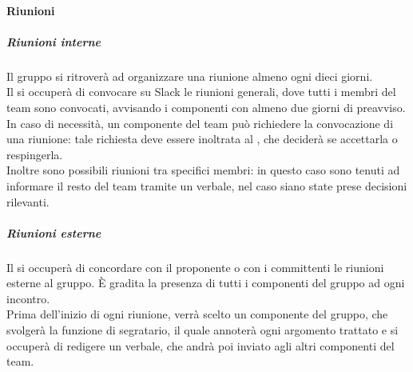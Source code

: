 	\paragraph{Riunioni}
		\subparagraph{Riunioni interne}
		Il gruppo si ritroverà ad organizzare una riunione almeno ogni dieci giorni. \\
		Il \RES si occuperà di convocare su Slack le riunioni generali, dove tutti i membri del team sono convocati, avvisando i componenti con almeno due giorni di preavviso. \\
		In caso di necessità, un componente del team può richiedere la convocazione di una riunione: tale richiesta deve essere inoltrata al \RES, che deciderà se accettarla o respingerla. \\
		Inoltre sono possibili riunioni tra specifici membri: in questo caso sono tenuti ad informare il resto del team tramite un verbale, nel caso siano state prese decisioni rilevanti. \\
		\subparagraph{Riunioni esterne}
		Il \RES si occuperà di concordare con il proponente o con i committenti le riunioni esterne al gruppo. È gradita la presenza di tutti i componenti del gruppo ad ogni incontro. \\
		Prima dell'inizio di ogni riunione, verrà scelto un componente del gruppo, che svolgerà la funzione di segratario, il quale annoterà ogni argomento trattato e si occuperà di redigere un verbale, che andrà poi inviato agli altri componenti del team.
